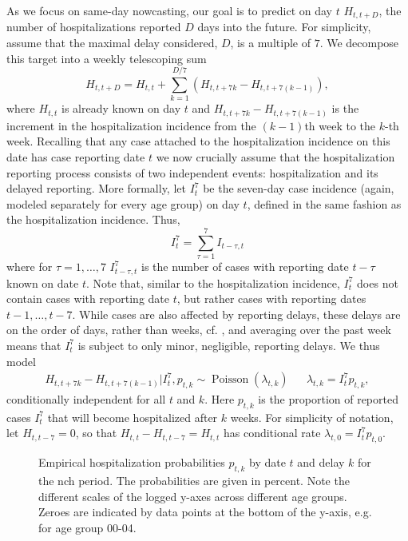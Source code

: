 As we focus on same-day nowcasting, our goal is to predict on day $t$ $H^{}_{t, t + D}$, the number of hospitalizations reported $D$ days into the future. For simplicity, assume that the maximal delay considered, $D$, is a multiple of $7$. We decompose this target into a weekly telescoping sum 
$$
    H^{}_{t, t + D} = H^{}_{t, t} + \sum_{k = 1} ^{D / 7} (H^{}_{t, t + 7k} - H_{t, t + 7 ( k - 1)}),
$$
where $H_{t,t}$ is already known on day $t$ and $H_{t, t + 7k} - H_{t, t + 7 ( k - 1)}$ is the increment in the hospitalization incidence from the $(k-1)$th week to the $k$-th week. Recalling that any case attached to the hospitalization incidence on this date has case reporting date $t$ we now crucially assume that the hospitalization reporting process consists of two independent events: hospitalization and its delayed reporting.
More formally, let $I^{7}_{t}$ be the seven-day case incidence (again, modeled separately for every age group) on day $t$, defined in the same fashion as the hospitalization incidence. Thus,
$$
    I^{7}_t = \sum_{\tau = 1}^{7} I^{}_{t - \tau, t}
$$
where for $\tau = 1, \dots, 7$ $I^{7}_{t - \tau, t}$ is the number of cases with reporting date $t - \tau$ known on date $t$. Note that, similar to the hospitalization incidence, $I^{7}_t$ does not contain cases with reporting date $t$, but rather cases with reporting dates $t - 1, \dots, t - 7$. While cases are also affected by reporting delays, these delays are on the order of days, rather than weeks, cf. , and averaging over the past week means that $I^{7}_t$ is subject to only minor, negligible, reporting delays. We thus model 
\begin{align}
    \label{eq:hosp_increment_distribution}
    H_{t, t + 7k} - H^{}_{t, t + 7 ( k - 1)} | I^{7}_t, p^{}_{t,k} \sim \operatorname{Poisson} \left( \lambda^{}_{t,k} \right) && \lambda^{}_{t,k} = I^{7}_{t} p^{}_{t,k},
\end{align}
conditionally independent for all $t$ and $k$.
Here $p^{}_{t,k}$ is the proportion of reported cases $I^{7}_{t}$ that will become hospitalized after $k$ weeks.
For simplicity of notation, let $H_{t, t - 7} = 0$, so that $H_{t,t} - H_{t, t- 7} = H_{t,t}$ has conditional rate $\lambda_{t,0} = I^{7}_t p_{t,0}$.

\begin{figure}
    \resizebox{\textwidth}{!}{%
    }
    \caption{Empirical hospitalization probabilities $\hat p_{t,k}$ by date $t$ and delay $k$ for the \gls{nch} period. The probabilities are given in percent. Note the different scales of the logged y-axes across different age groups. Zeroes are indicated by data points at the bottom of the y-axis, e.g. for age group 00-04.}
    \label{fig:delay_hospitalization_probabilities}
\end{figure}

